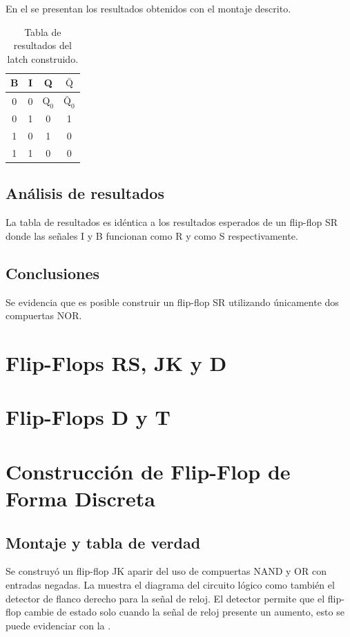 \documentclass[journal, table]{IEEEtran}
\begin{document}
En el  se presentan los resultados obtenidos con el
montaje descrito.

\begin{table}[htbp!]
\centering
{}
	\begin{tabular}{c|c|c|c}
			\toprule
			B & I & Q & $\bar{\text{Q}}$ \\
			\midrule
			0 & 0 & $\text{Q}_0$ & $\bar{\text{Q}}_0$ \\
			0 & 1 & 0 & 1 \\
			1 & 0 & 1 & 0 \\
			1 & 1 & 0 & 0 \\
			\bottomrule
	\end{tabular}
	\caption{Tabla de resultados del latch construido.}
	\label{tab:basic-latch}
\end{table}

\subsection{Análisis de resultados}
La tabla de resultados es idéntica a los resultados esperados de un flip-flop
SR donde las señales I y B funcionan como R y como S respectivamente.

\subsection{Conclusiones}
Se evidencia que es posible construir un flip-flop SR utilizando únicamente dos
compuertas NOR.

\section{Flip-Flops RS, JK y D}

\section{Flip-Flops D y T}

\section{Construcción de Flip-Flop de Forma Discreta}
\subsection{Montaje y tabla de verdad}
Se construyó un flip-flop JK aparir del uso de compuertas NAND y OR con entradas negadas.
La  muestra el diagrama del circuito lógico como también
el detector de flanco derecho para la señal de reloj.
El detector permite que el flip-flop cambie de estado solo cuando la señal de
reloj presente un aumento, esto se puede evidenciar con la .
\end{document}
